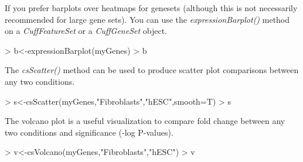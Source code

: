 \documentclass[10pt]{article}
\newcommand{\Rclass}[1]{{\textit{#1}}}
\newcommand{\Rmethod}[1]{{\textit{#1}}}
\begin{document}
If you prefer barplots over heatmaps for genesets (although this is not necessarily recommended for large gene sets). You can use the \Rmethod{expressionBarplot()} method on a \Rclass{CuffFeatureSet} or a \Rclass{CuffGeneSet} object.
\begin{Schunk}
\begin{Sinput}
> b<-expressionBarplot(myGenes)
> b
\end{Sinput}
\end{Schunk}
\begin{figure}[htp]
	\begin{center}
	\end{center}
\end{figure}

The \Rmethod{csScatter()} method can be used to produce scatter plot comparisons between any two conditions.
\begin{Schunk}
\begin{Sinput}
> s<-csScatter(myGenes,"Fibroblasts","hESC",smooth=T)
> s
\end{Sinput}
\end{Schunk}

\begin{figure}[htp]
	\begin{center}
	\end{center}
\end{figure}


The volcano plot is a useful visualization to compare fold change between any two conditions and significance (-log P-values).
\begin{Schunk}
\begin{Sinput}
> v<-csVolcano(myGenes,"Fibroblasts","hESC")
> v
\end{Sinput}
\end{Schunk}

\begin{figure}[htp]
	\begin{center}
	\end{center}
\end{figure}
\end{document}
